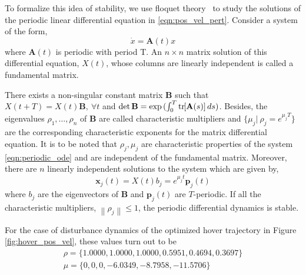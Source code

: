 \documentclass[10pt]{article}
\newcommand{\norm}[1]{\ensuremath{\left\| #1 \right\|}}
\newcommand{\bracket}[1]{\ensuremath{\left[ #1 \right]}}
\newcommand{\tr}[1]{\mathrm{tr}\ensuremath{\negthickspace\bracket{#1}}}
\begin{document}

To formalize this idea of stability, we use floquet theory~\cite[Section 3.5]{teschl2012ordinary} to study the solutions of the periodic linear differential equation in \eqref{eqn:pos_vel_pert}. Consider a system of the form,
\begin{equation}\label{eqn:periodic_ode}
	\dot{x} = \mathbf{A}(t) x
\end{equation}
where $ \mathbf{A}(t) $ is periodic with period T. An $ n \times n $ matrix solution of this differential equation, $ X(t) $, whose columns are linearly independent is called a fundamental matrix.

There exists a non-singular constant matrix $ \mathbf{B} $ such that $ X(t+T) = X(t)\mathbf{B},\ \forall t $ and $ \det{\mathbf{B}} =\exp{(\int_{0}^{T} \tr{\mathbf{A}(s)} ds)} $. Besides, the eigenvalues $ \rho_1, \dots, \rho_n $ of $ \mathbf{B} $ are called characteristic multipliers and $ \lbrace \mu_j \vert\ \rho_j = e^{\mu_j T} \rbrace $ are the corresponding characteristic exponents for the matrix differential equation. It is to be noted that $ \rho_j, \mu_j $ are characteristic properties of the system \eqref{eqn:periodic_ode} and are independent of the fundamental matrix. Moreover, there are $ n $ linearly independent solutions to the system which are given by,
\[ \mathbf{x}_j(t) = X(t)b_j = e^{\mu_j t} \mathbf{p}_j(t)\]
where $ b_j $ are the eigenvectors of $ \mathbf{B} $ and $ \mathbf{p}_j(t) $ are $ T $-periodic. If all the characteristic multipliers, $ \norm{\rho_j} \le 1 $, the periodic differential dynamics is stable.

For the case of disturbance dynamics of the optimized hover trajectory in Figure \ref{fig:hover_pos_vel}, these values turn out to be
\begin{gather*}
	\rho = \lbrace 1.0000, 1.0000, 1.0000, 0.5951, 0.4694, 0.3697 \rbrace\\
	\mu = \lbrace 0, 0, 0, -6.0349, -8.7958, -11.5706 \rbrace
\end{gather*}

\end{document}
